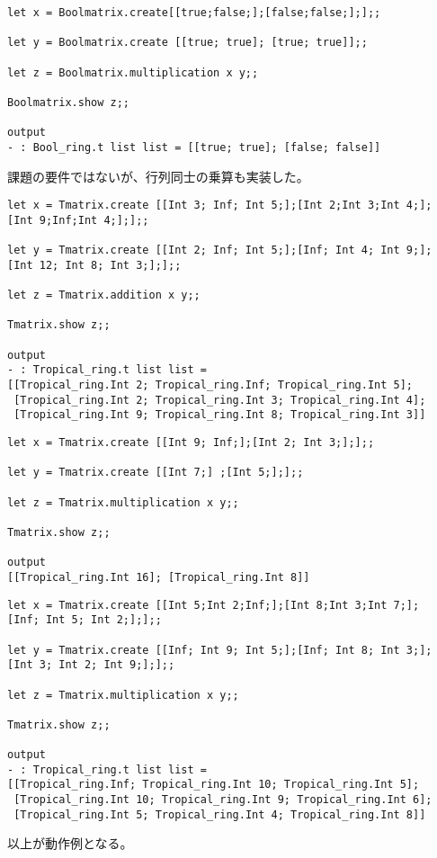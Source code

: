 \documentclass[uplatex,12pt]{jsarticle}
\begin{document}
\vspace{12pt}
\begin{lstlisting}[caption=Bool matrix同士の乗算]
let x = Boolmatrix.create[[true;false;];[false;false;];];;

let y = Boolmatrix.create [[true; true]; [true; true]];;

let z = Boolmatrix.multiplication x y;;

Boolmatrix.show z;;

output
- : Bool_ring.t list list = [[true; true]; [false; false]]
\end{lstlisting}
課題の要件ではないが、行列同士の乗算も実装した。

\vspace{12pt}
\begin{lstlisting}[caption=tropical matrix同士の加算]
let x = Tmatrix.create [[Int 3; Inf; Int 5;];[Int 2;Int 3;Int 4;];
[Int 9;Inf;Int 4;];];;

let y = Tmatrix.create [[Int 2; Inf; Int 5;];[Inf; Int 4; Int 9;];
[Int 12; Int 8; Int 3;];];;

let z = Tmatrix.addition x y;;

Tmatrix.show z;;

output
- : Tropical_ring.t list list =
[[Tropical_ring.Int 2; Tropical_ring.Inf; Tropical_ring.Int 5];
 [Tropical_ring.Int 2; Tropical_ring.Int 3; Tropical_ring.Int 4];
 [Tropical_ring.Int 9; Tropical_ring.Int 8; Tropical_ring.Int 3]]
\end{lstlisting}

\vspace{12pt}
\begin{lstlisting}[caption=tropical matrixとvectorの乗算]
let x = Tmatrix.create [[Int 9; Inf;];[Int 2; Int 3;];];;

let y = Tmatrix.create [[Int 7;] ;[Int 5;];];;

let z = Tmatrix.multiplication x y;;

Tmatrix.show z;;

output
[[Tropical_ring.Int 16]; [Tropical_ring.Int 8]]
\end{lstlisting}

\vspace{12pt}
\begin{lstlisting}[caption=tropical matrix同士の乗算]
let x = Tmatrix.create [[Int 5;Int 2;Inf;];[Int 8;Int 3;Int 7;];
[Inf; Int 5; Int 2;];];;

let y = Tmatrix.create [[Inf; Int 9; Int 5;];[Inf; Int 8; Int 3;];
[Int 3; Int 2; Int 9;];];;

let z = Tmatrix.multiplication x y;;

Tmatrix.show z;;

output
- : Tropical_ring.t list list =
[[Tropical_ring.Inf; Tropical_ring.Int 10; Tropical_ring.Int 5];
 [Tropical_ring.Int 10; Tropical_ring.Int 9; Tropical_ring.Int 6];
 [Tropical_ring.Int 5; Tropical_ring.Int 4; Tropical_ring.Int 8]]
\end{lstlisting}
以上が動作例となる。
\end{document}
